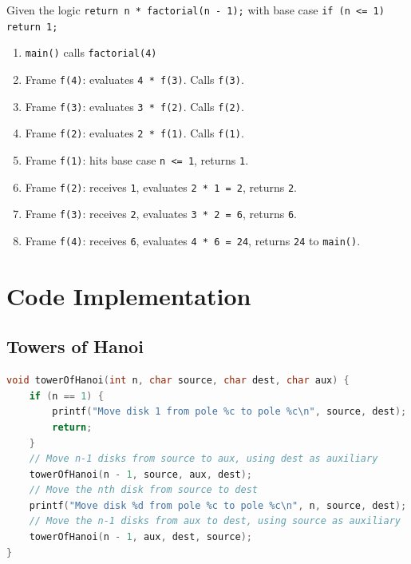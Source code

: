 \begin{example}
Given the logic \texttt{return n * factorial(n - 1);} with base case \texttt{if (n <= 1) return 1;}
\begin{enumerate}
    \item \texttt{main()} calls \texttt{factorial(4)}
    \item Frame \texttt{f(4)}: evaluates \texttt{4 * f(3)}. Calls \texttt{f(3)}.
    \item Frame \texttt{f(3)}: evaluates \texttt{3 * f(2)}. Calls \texttt{f(2)}.
    \item Frame \texttt{f(2)}: evaluates \texttt{2 * f(1)}. Calls \texttt{f(1)}.
    \item Frame \texttt{f(1)}: hits base case \texttt{n <= 1}, returns \texttt{1}.
    \item Frame \texttt{f(2)}: receives \texttt{1}, evaluates \texttt{2 * 1 = 2}, returns \texttt{2}.
    \item Frame \texttt{f(3)}: receives \texttt{2}, evaluates \texttt{3 * 2 = 6}, returns \texttt{6}.
    \item Frame \texttt{f(4)}: receives \texttt{6}, evaluates \texttt{4 * 6 = 24}, returns \texttt{24} to \texttt{main()}.
\end{enumerate}
\end{example}

\section{Code Implementation}

\subsection{Towers of Hanoi}
\begin{lstlisting}[language=C]
void towerOfHanoi(int n, char source, char dest, char aux) {
    if (n == 1) {
        printf("Move disk 1 from pole %c to pole %c\n", source, dest);
        return;
    }
    // Move n-1 disks from source to aux, using dest as auxiliary
    towerOfHanoi(n - 1, source, aux, dest);
    // Move the nth disk from source to dest
    printf("Move disk %d from pole %c to pole %c\n", n, source, dest);
    // Move the n-1 disks from aux to dest, using source as auxiliary
    towerOfHanoi(n - 1, aux, dest, source);
}
\end{lstlisting}

